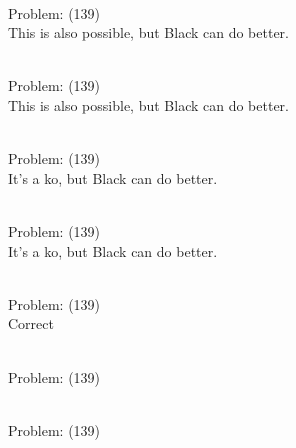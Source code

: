 \documentclass[11pt]{article}
\begin{document}
\begin{minipage}[t]{0.5\textwidth}
  {\centering
  
\\
Problem: (139)\\
This is also possible, but Black can do better.\\
  }
\end{minipage}
\begin{minipage}[t]{0.5\textwidth}
  {\centering
  
\\
Problem: (139)\\
This is also possible, but Black can do better.\\
  }
\end{minipage}
\begin{minipage}[t]{0.5\textwidth}
  {\centering
  
\\
Problem: (139)\\
It's a ko, but Black can do better.\\
  }
\end{minipage}
\begin{minipage}[t]{0.5\textwidth}
  {\centering
  
\\
Problem: (139)\\
It's a ko, but Black can do better.\\
  }
\end{minipage}
\begin{minipage}[t]{0.5\textwidth}
  {\centering
  
\\
Problem: (139)\\
Correct\\
  }
\end{minipage}
\begin{minipage}[t]{0.5\textwidth}
  {\centering
  
\\
Problem: (139)\\
  }
\end{minipage}
\begin{minipage}[t]{0.5\textwidth}
  {\centering
  
\\
Problem: (139)\\
  }
\end{minipage}
\end{document}
